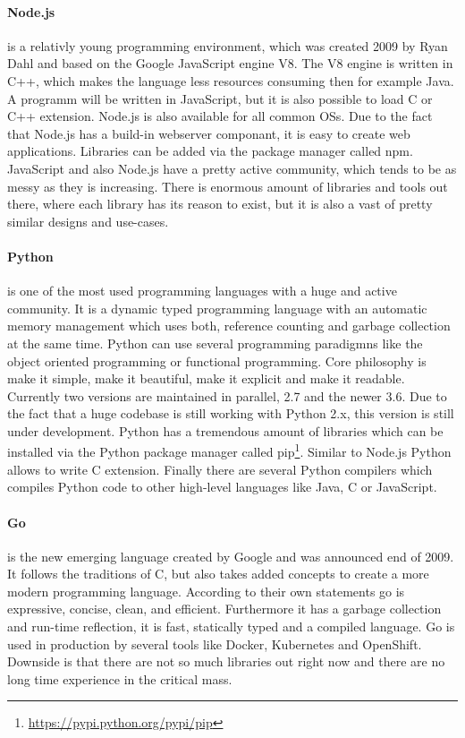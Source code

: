 \paragraph{Node.js} is a relativly young programming environment, which was created 2009 by Ryan Dahl and based on the Google JavaScript engine V8.
The V8 engine is written in C++, which makes the language less resources consuming then for example Java.
A programm will be written in JavaScript, but it is also possible to load C or C++ extension.
Node.js is also available for all common \acp{OS}.
Due to the fact that Node.js has a build-in webserver componant, it is easy to create web applications.
Libraries can be added via the package manager called npm.
JavaScript and also Node.js have a pretty active community, which tends to be as messy as they is increasing.
There is enormous amount of libraries and tools out there, where each library has its reason to exist, but it is also a vast of pretty similar designs and use-cases.

\paragraph{Python} is one of the most used programming languages with a huge and active community.\autocite[cf.]{ProgramminLanguage:2017}
It is a dynamic typed programming language with an automatic memory management which uses both, reference counting and garbage collection at the same time.\autocite[cf.]{Python:GarbageCollection}
Python can use several programming paradigmns like the object oriented programming or functional programming.
Core philosophy is make it simple, make it beautiful, make it explicit and make it readable.
Currently two versions are maintained in parallel, 2.7 and the newer 3.6.
Due to the fact that a huge codebase is still working with Python 2.x, this version is still under development.\autocite[cf.]{Peterson:PythonReleaseSchedule}
Python has a tremendous amount of libraries which can be installed via the Python package manager called pip\footnote{\url{https://pypi.python.org/pypi/pip}}.
Similar to Node.js Python allows to write C extension.
Finally there are several Python compilers which compiles Python code to other high-level languages like Java, C or JavaScript.

\paragraph{Go} is the new emerging language created by Google and was announced end of 2009.
It follows the traditions of C, but also takes added concepts to create a more modern programming language.
According to their own statements go is expressive, concise, clean, and efficient.\autocite[cf.]{Go:Documentation}
Furthermore it has a garbage collection and run-time reflection, it is fast, statically typed and a compiled language.\autocite[cf.]{Go:Documentation}
Go is used in production by several tools like Docker, Kubernetes and OpenShift.
Downside is that there are not so much libraries out right now and there are no long time experience in the critical mass.


